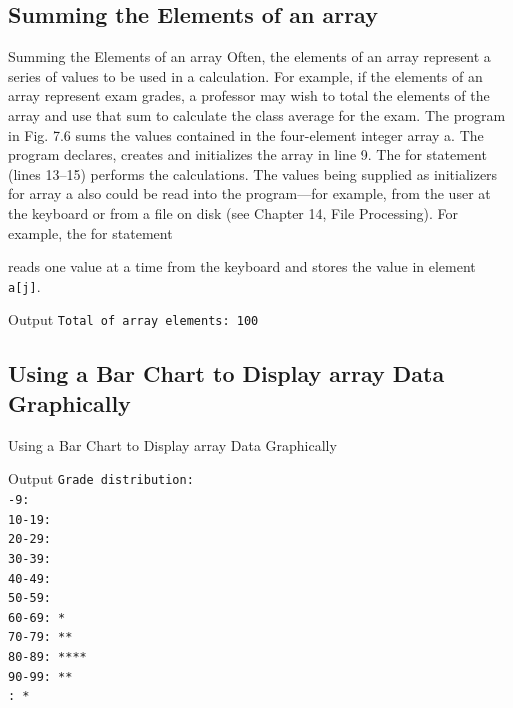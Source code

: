\documentclass[10pt]{beamer}
\begin{document}
\subsection{Summing the Elements of an array}
\begin{frame}{Summing the Elements of an array}
	Often, the elements of an array represent a series of values to be used in a calculation. For
	example, if the elements of an array represent exam grades, a professor may wish to total
	the elements of the array and use that sum to calculate the class average for the exam.
	The program in Fig. 7.6 sums the values contained in the four-element integer array
	a. The program declares, creates and initializes the array in line 9. The for statement
	(lines 13–15) performs the calculations. The values being supplied as initializers for array
	a also could be read into the program—for example, from the user at the keyboard or from
	a file on disk (see Chapter 14, File Processing). For example, the for statement
	
	reads one value at a time from the keyboard and stores the value in element \texttt{a[j]}.
\end{frame}
	
\begin{frame}
	
	\begin{block}{\color{white}Output}
		\texttt{Total of array elements: 100}
	\end{block}
\end{frame}


\subsection{Using a Bar Chart to Display array Data Graphically}

\begin{frame}{Using a Bar Chart to Display array Data Graphically}
	
\end{frame}

\begin{frame}
	\begin{block}{\color{white}Output}
		\texttt{Grade distribution:\\
		\:\:\:\:-9:\\
		10-19:\\
		20-29:\\
		30-39:\\
		40-49:\\
		50-59:\\
		60-69: *\\
		70-79: **\\
		80-89: ****\\
		90-99: **\\
		\:\:\:\:: *\\}
	\end{block}
\end{frame}
\end{document}
